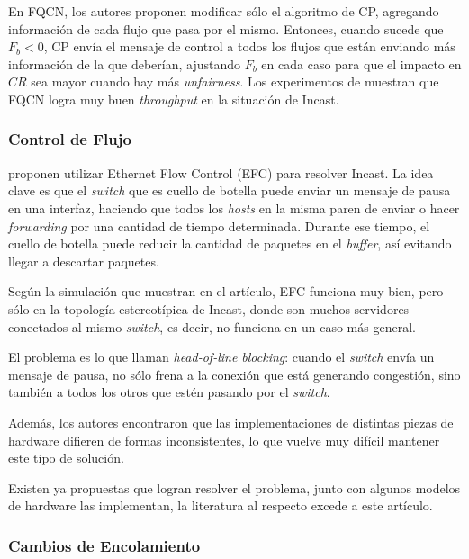 \documentclass[runningheads,a4paper]{llncs}
\begin{document}
En FQCN, los autores proponen modificar sólo el algoritmo de CP, agregando información de cada flujo que pasa por el mismo. Entonces, cuando sucede que $F_b < 0$, CP envía el mensaje de control a todos los flujos que están enviando más información de la que deberían, ajustando $F_b$ en cada caso para que el impacto en $CR$ sea mayor cuando hay más \textit{unfairness}. Los experimentos de \cite{Zhang_QCN_2011} muestran que FQCN logra muy buen \textit{throughput} en la situación de Incast.

\subsubsection{Control de Flujo}


\citet{Phanishayee_Throughput_2008} proponen utilizar Ethernet Flow Control (EFC) para resolver Incast.  La idea clave es que el \textit{switch} que es cuello de botella puede enviar un mensaje de pausa en una interfaz, haciendo que todos los \textit{hosts} en la misma paren de enviar o hacer \textit{forwarding} por una cantidad de tiempo determinada. Durante ese tiempo, el cuello de botella puede reducir la cantidad de paquetes en el \textit{buffer}, así evitando llegar a descartar paquetes. 

Según la simulación que muestran en el artículo, EFC funciona muy bien, pero sólo en la topología estereotípica de Incast, donde son muchos servidores conectados al mismo \textit{switch}, es decir, no funciona en un caso más general.

El problema es lo que llaman \textit{head-of-line blocking}: cuando el \textit{switch} envía un mensaje de pausa, no sólo frena a la conexión que está generando congestión, sino también a todos los otros que estén pasando por el \textit{switch}.

Además, los autores encontraron que las implementaciones de distintas piezas de hardware difieren de formas inconsistentes, lo que vuelve muy difícil mantener este tipo de solución.

Existen ya propuestas que logran resolver el problema, junto con algunos modelos de hardware las implementan, la literatura al respecto excede a este artículo.

\subsubsection{Cambios de Encolamiento}
\end{document}
